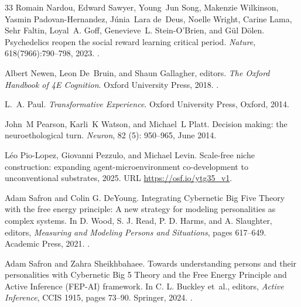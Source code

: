 \documentclass[12pt,fleqn]{article}
\begin{document}
\begin{thebibliography}{33}
  Romain Nardou, Edward Sawyer, Young~Jun Song, Makenzie Wilkinson,
  Yasmin Padovan-Hernandez, J\'unia~Lara de~Deus, Noelle Wright, Carine Lama,
  Sehr Faltin, Loyal~A. Goff, Genevieve~L. Stein-O'Brien, and G\"ul D\"olen.
  \newblock Psychedelics reopen the social reward learning critical period.
  \newblock \emph{Nature}, 618(7966):790--798, 2023.
  \newblock {}.

  Albert Newen, Leon De~Bruin, and Shaun Gallagher, editors.
  \newblock \emph{The Oxford Handbook of 4E Cognition}.
  \newblock Oxford University Press, 2018.
  \newblock {}.

  L.~A. Paul.
  \newblock \emph{Transformative Experience}.
  \newblock Oxford University Press, Oxford, 2014.

  John~M Pearson, Karli~K Watson, and Michael~L Platt.
  \newblock Decision making: the neuroethological turn.
  \newblock \emph{Neuron}, 82 (5): 950--965, June 2014.

  L\'eo Pio-Lopez, Giovanni Pezzulo, and Michael Levin.
  \newblock Scale-free niche construction: expanding agent-microenvironment
  co-development to unconventional substrates, 2025.
  \newblock URL \url{https://osf.io/ytg35_v1}.

  Adam Safron and Colin G. DeYoung.
  \newblock Integrating Cybernetic Big Five Theory with the free energy
  principle: A new strategy for modeling personalities as complex systems.
  \newblock In D. Wood, S. J. Read, P. D. Harms, and A. Slaughter, editors,
  \emph{Measuring and Modeling Persons and Situations}, pages 617--649.
  Academic Press, 2021.
  \newblock {}.

  Adam Safron and Zahra Sheikhbahaee.
  \newblock Towards understanding persons and their personalities with
  Cybernetic Big 5 Theory and the Free Energy Principle and Active Inference
  (FEP-AI) framework.
  \newblock In C. L. Buckley et~al., editors, \emph{Active Inference},
  CCIS 1915, pages 73--90. Springer, 2024.
  \newblock {}.


\end{thebibliography}
\end{document}
